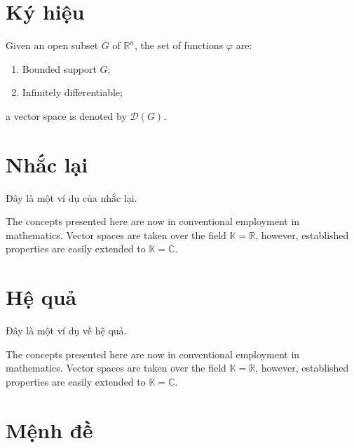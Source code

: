 \documentclass[12pt,fleqn]{book} %
\begin{document}

\section{Ký hiệu}

\begin{notation}
Given an open subset $G$ of $\mathbb{R}^n$, the set of functions $\varphi$ are:
\begin{enumerate}
\item Bounded support $G$;
\item Infinitely differentiable;
\end{enumerate}
a vector space is denoted by $\mathcal{D}(G)$. 
\end{notation}


\section{Nhắc lại}

Đây là một ví dụ của nhắc lại.

\begin{remark}
The concepts presented here are now in conventional employment in mathematics. Vector spaces are taken over the field $\mathbb{K}=\mathbb{R}$, however, established properties are easily extended to $\mathbb{K}=\mathbb{C}$.
\end{remark}


\section{Hệ quả}

Đây là một ví dụ về hệ quả.

\begin{corollary}
The concepts presented here are now in conventional employment in mathematics. Vector spaces are taken over the field $\mathbb{K}=\mathbb{R}$, however, established properties are easily extended to $\mathbb{K}=\mathbb{C}$.
\end{corollary}


\section{Mệnh đề}
\end{document}
